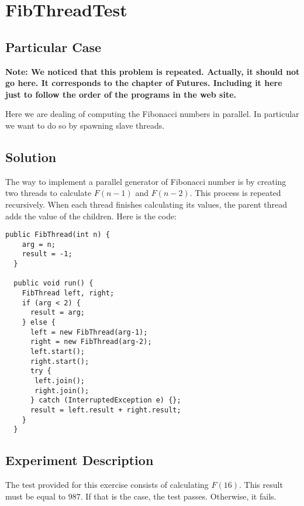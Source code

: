 \section{\textbf{FibThreadTest}}
\subsection{Particular Case}
\par
\textbf{Note: We noticed that this problem is repeated. Actually, it should not
go here. It corresponds to the chapter of Futures. Including it here just to
follow the order of the programs in the web site.}
\par
Here we are dealing of computing the Fibonacci numbers in parallel. In
particular we want to do so by spawning slave threads.
\par
\subsection{Solution}
\par
The way to implement a parallel generator of Fibonacci number is by creating two
threads to calculate $F(n-1)$ and $F(n-2)$. This process is repeated
recursively. When each thread finishes calculating its values, the parent thread
adds the value of the children. Here is the code:
\par
\hfill
\begin{lstlisting}[style=numbers]
  public FibThread(int n) {
    arg = n;
    result = -1;
  }

  public void run() {
    FibThread left, right;
    if (arg < 2) {
      result = arg;
    } else {
      left = new FibThread(arg-1);
      right = new FibThread(arg-2);
      left.start();
      right.start();
      try {
       left.join();
       right.join();
      } catch (InterruptedException e) {};
      result = left.result + right.result;
    }
  }
\end{lstlisting}
\hfill
\par
\subsection{Experiment Description}
\par
The test provided for this exercise consists of calculating $F(16)$. This result
must be equal to $987$. If that is the case, the test passes. Otherwise, it
fails.
\par
